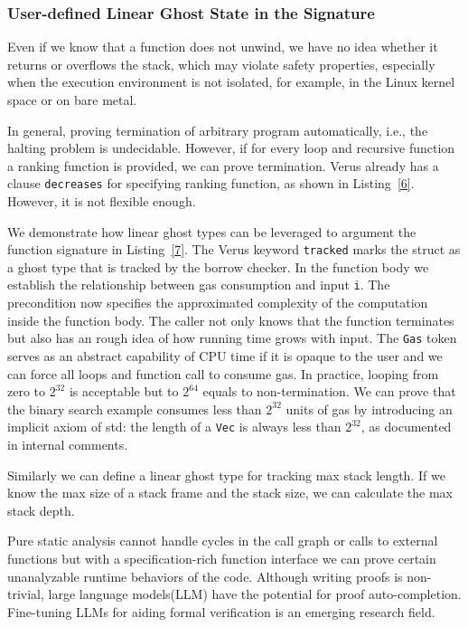 \documentclass[conference]{IEEEtran}
\begin{document}
\subsubsection{User-defined Linear Ghost State in the Signature}
Even if we know that a function does not unwind, we have no idea whether it returns or overflows the stack, which may violate safety properties, especially when the execution environment is not isolated, for example, in the Linux kernel space or on bare metal.

In general, proving termination of arbitrary program automatically, i.e., the halting problem is undecidable. However, if for every loop and recursive function a ranking function is provided, we can prove termination. Verus already has a clause \texttt{decreases} for specifying ranking function, as shown in Listing~\ref{6}. However, it is not flexible enough. 

We demonstrate how linear ghost types can be leveraged to argument the function signature in Listing~\ref{7}. The Verus keyword \texttt{tracked} marks the struct as a ghost type that is tracked by the borrow checker. In the function body we establish the relationship between gas consumption and input \texttt{i}. The precondition now specifies the approximated complexity of the computation inside the function body. The caller not only knows that the function terminates but also has an rough idea of how running time grows with input. The \texttt{Gas} token serves as an abstract capability of CPU time if it is opaque to the user and we can force all loops and function call to consume gas. In practice, looping from zero to $2^{32}$ is acceptable but to $2^{64}$ equals to non-termination. We can prove that the binary search example consumes less than $2^{32}$ units of gas by introducing an implicit axiom of std: the length of a \texttt{Vec} is always less than $2^{32}$, as documented in internal comments.        

Similarly we can define a linear ghost type for tracking max stack length. If we know the max size of a stack frame and the stack size, we can calculate the max stack depth. 

Pure static analysis cannot handle cycles in the call graph or calls to external functions but with a specification-rich function interface we can prove certain unanalyzable runtime behaviors of the code. Although writing proofs is non-trivial, large language models(LLM) have the potential for proof auto-completion. Fine-tuning LLMs for aiding formal verification\cite{chen2025automatedproofgenerationrust,shefer2025llmsenableverificationmainstream} is an emerging research field.  
\end{document}
